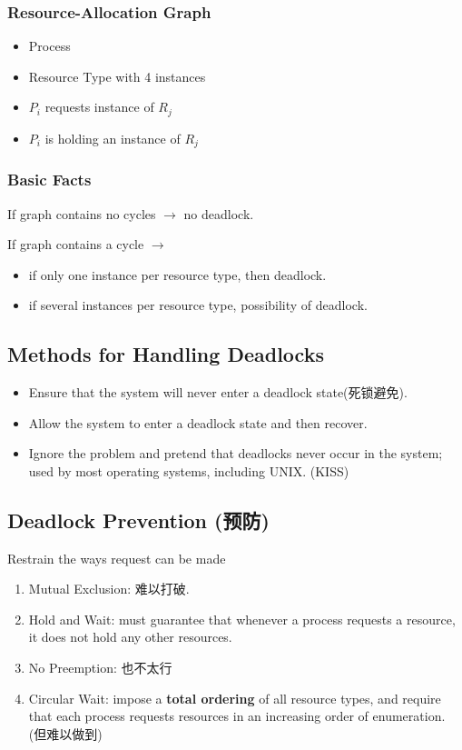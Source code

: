 \subsubsection{Resource-Allocation Graph}
\begin{itemize}
    \item Process
    \item Resource Type with 4 instances
    \item $P_i$ requests instance of $R_j$
    \item $P_i$ is holding an instance of $R_j$
\end{itemize}


\subsubsection{Basic Facts}
If graph contains no cycles $\to$ no deadlock.

If graph contains a cycle $\to$
\begin{itemize}
    \item if only one instance per resource type, then deadlock.
    \item if several instances per resource type, possibility of deadlock.    
\end{itemize}

\subsection{Methods for Handling Deadlocks}
\begin{itemize}
    \item Ensure that the system will never enter a deadlock state(死锁避免).
    \item Allow the system to enter a deadlock state and then recover.
    \item Ignore the problem and pretend that deadlocks never occur in the system; used by most operating systems, including UNIX. (KISS)
\end{itemize}

\subsection{Deadlock Prevention (预防)}
Restrain the ways request can be made
\begin{enumerate}
    \item Mutual Exclusion: 难以打破. 
    \item Hold and Wait: must guarantee that whenever a process requests a resource, it does not hold any other resources.
    \item No Preemption: 也不太行
    \item Circular Wait: impose a \textbf{total ordering} of all resource types, and require that each process requests resources in an increasing order of enumeration. (但难以做到)
\end{enumerate}

